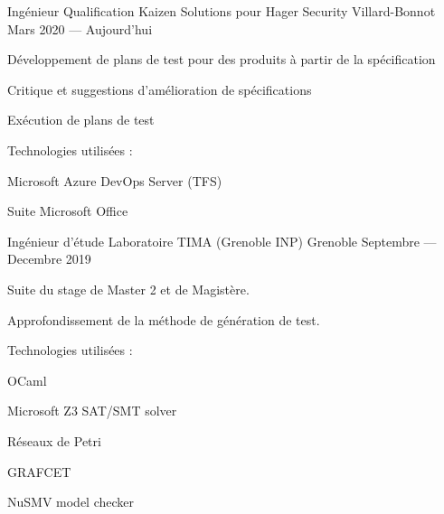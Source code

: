


\begin{cventries}


\cventry
{Ingénieur Qualification} %
{Kaizen Solutions pour Hager Security} %
{Villard-Bonnot} %
{Mars 2020 --- Aujourd'hui} %
{ %
  \begin{cvitems}
  \item Développement de plans de test pour des produits à partir de la spécification
  \item Critique et suggestions d'amélioration de spécifications
  \item Exécution de plans de test
  \item Technologies utilisées :
    \vspace{.4cm}
    \begin{cvitems}
    \item Microsoft Azure DevOps Server (TFS)
    \item Suite Microsoft Office
    \end{cvitems}
    \vspace{.4cm}
  \end{cvitems}
}

\cventry
{Ingénieur d'étude} %
{Laboratoire TIMA (Grenoble INP)} %
{Grenoble} %
{Septembre --- Decembre 2019} %
{ %
\begin{cvitems}
\item Suite du stage de Master 2 et de Magistère.
\item Approfondissement de la méthode de génération de test.
\item Technologies utilisées :
  \vspace{.4cm}
  \begin{cvitems}
    \item OCaml
    \item Microsoft Z3 SAT/SMT solver
    \item Réseaux de Petri
    \item GRAFCET
    \item NuSMV model checker
  \end{cvitems}
\end{cvitems}
}


\end{cventries}
